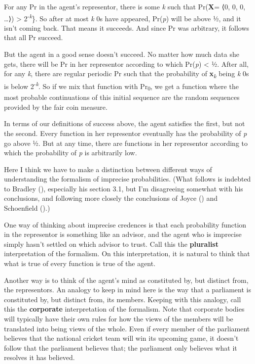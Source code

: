 \documentclass[
  11pt,
  letterpaper,
  DIV=11,
  numbers=noendperiod,
  twoside]{scrartcl}
\begin{document}
For any Pr in the agent's representor, there is some \emph{k} such that
Pr(\textbf{X}= ⟨0, 0, 0, \dots⟩) \textgreater{}
2\textsuperscript{-\emph{k}}\}. So after at most \emph{k} 0s have
appeared, Pr(\emph{p}) will be above ½, and it isn't coming back. That
means it succeeds. And since Pr was arbitrary, it follows that all Pr
succeed.

But the agent in a good sense doesn't succeed. No matter how much data
she gets, there will be Pr in her representor according to which
Pr(\emph{p}) \textless{} ½. After all, for any \emph{k}, there are
regular periodic Pr such that the probability of
\textbf{x}\textsubscript{\emph{k}} being \emph{k} 0s is below
2\textsuperscript{-\emph{k}}. So if we mix that function with
Pr\textsubscript{0}, we get a function where the most probable
continuations of this initial sequence are the random sequences provided
by the fair coin measure.

In terms of our definitions of success above, the agent satisfies the
first, but not the second. Every function in her representor eventually
has the probability of \emph{p} go above ½. But at any time, there are
functions in her representor according to which the probability of
\emph{p} is arbitrarily low.

Here I think we have to make a distinction between different ways of
understanding the formalism of imprecise probabilities. (What follows is
indebted to Bradley (), especially his
section 3.1, but I'm disagreeing somewhat with his conclusions, and
following more closely the conclusions of Joyce
() and Schoenfield
().)

One way of thinking about imprecise credences is that each probability
function in the representor is something like an advisor, and the agent
who is imprecise simply hasn't settled on which advisor to trust. Call
this the \textbf{pluralist} interpretation of the formalism. On this
interpretation, it is natural to think that what is true of every
function is true of the agent.

Another way is to think of the agent's mind as constituted by, but
distinct from, the representors. An analogy to keep in mind here is the
way that a parliament is constituted by, but distinct from, its members.
Keeping with this analogy, call this the \textbf{corporate}
interpretation of the formalism. Note that corporate bodies will
typically have their own rules for how the views of the members will be
translated into being views of the whole. Even if every member of the
parliament believes that the national cricket team will win its upcoming
game, it doesn't follow that the parliament believes that; the
parliament only believes what it resolves it has believed.
\end{document}
